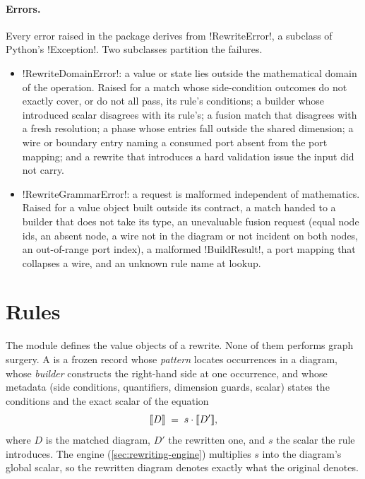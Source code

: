 \paragraph{Errors.}
Every error raised in the package derives from \py!RewriteError!, a subclass of Python's
\py!Exception!. Two subclasses partition the failures.
\begin{itemize}
\item \py!RewriteDomainError!: a value or state lies outside the mathematical domain of the
  operation. Raised for a match whose side-condition outcomes do not exactly cover, or do not all
  pass, its rule's conditions; a builder whose introduced scalar disagrees with its rule's; a
  fusion match that disagrees with a fresh resolution; a phase whose entries fall outside the
  shared dimension; a wire or boundary entry naming a consumed port absent from the port mapping;
  and a rewrite that introduces a hard validation issue the input did not carry.
\item \py!RewriteGrammarError!: a request is malformed independent of mathematics. Raised for a
  value object built outside its contract, a match handed to a builder that does not take its
  type, an unevaluable fusion request (equal node ids, an absent node, a wire not in the diagram
  or not incident on both nodes, an out-of-range port index), a malformed \py!BuildResult!, a port
  mapping that collapses a wire, and an unknown rule name at lookup.
\end{itemize}

\section{Rules}\label{sec:rewriting-rule}

The module  defines the value objects of a rewrite. None of them
performs graph surgery. A  is a frozen record whose \emph{pattern} locates occurrences
in a diagram, whose \emph{builder} constructs the right-hand side at one occurrence, and whose
metadata (side conditions, quantifiers, dimension guards, scalar) states the conditions and the
exact scalar of the equation
\begin{equation}\label{eq:rewriting-rule}
  \llbracket D \rrbracket \;=\; s \cdot \llbracket D' \rrbracket ,
\end{equation}
where $D$ is the matched diagram, $D'$ the rewritten one, and $s$ the scalar the rule introduces.
The engine (\cref{sec:rewriting-engine}) multiplies $s$ into the diagram's global scalar, so the
rewritten diagram denotes exactly what the original denotes.

